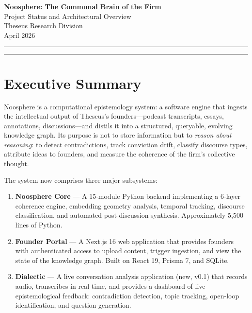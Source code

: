 \documentclass[11pt,letterpaper]{article}
\begin{document}
\thispagestyle{empty}

\vspace*{1cm}

\begin{center}
{\Large\bfseries\color{accent} Noosphere: The Communal Brain of the Firm}\\[8pt]
{\large\color{midgray} Project Status and Architectural Overview}\\[16pt]
{\normalsize Theseus Research Division}\\[4pt]
{\footnotesize\color{muted} April 2026}
\end{center}

\vspace{0.5cm}
\hrule
\vspace{0.3cm}
\tableofcontents
\vspace{0.3cm}
\hrule

\newpage

\section{Executive Summary}

Noosphere is a computational epistemology system: a software engine that ingests the intellectual output of Theseus's founders---podcast transcripts, essays, annotations, discussions---and distils it into a structured, queryable, evolving knowledge graph. Its purpose is not to store information but to \emph{reason about reasoning}: to detect contradictions, track conviction drift, classify discourse types, attribute ideas to founders, and measure the coherence of the firm's collective thought.

The system now comprises three major subsystems:

\begin{enumerate}
\item \textbf{Noosphere Core} --- A 15-module Python backend implementing a 6-layer coherence engine, embedding geometry analysis, temporal tracking, discourse classification, and automated post-discussion synthesis. Approximately 5,500 lines of Python.

\item \textbf{Founder Portal} --- A Next.js 16 web application that provides founders with authenticated access to upload content, trigger ingestion, and view the state of the knowledge graph. Built on React 19, Prisma 7, and SQLite.

\item \textbf{Dialectic} --- A live conversation analysis application (new, v0.1) that records audio, transcribes in real time, and provides a dashboard of live epistemological feedback: contradiction detection, topic tracking, open-loop identification, and question generation.
\end{enumerate}
\end{document}
